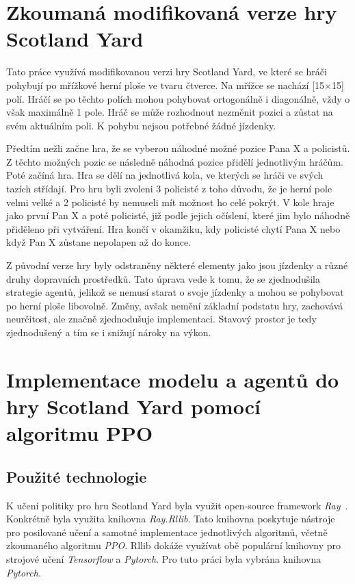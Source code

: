 \section{Zkoumaná modifikovaná verze hry Scotland Yard}\label{sec:zkoumana-modifikovana-verze-hry-scotland-yard}

Tato práce využívá modifikovanou verzi hry Scotland Yard, ve které se hráči pohybují po mřížkové herní ploše ve tvaru čtverce.
Na mřížce se nachází {\color{red}[15$\times$15]} polí.
Hráčí se po těchto polích mohou pohybovat ortogonálně i diagonálně, vždy o však maximálně 1 pole.
Hráč se může rozhodnout nezměnit pozici a zůstat na svém aktuálním poli.
K pohybu nejsou potřebné žádné jízdenky.

Předtím nežli začne hra, že se vyberou náhodné možné pozice Pana X a policistů.
Z těchto možných pozic se následně náhodná pozice přidělí jednotlivým hráčům.
Poté začíná hra.
Hra se dělí na jednotlivá kola, ve kterých se hráči ve svých tazích střídají.
Pro hru byli zvoleni 3 policisté z toho důvodu, že je herní pole velmi velké a 2 policisté by nemuseli mít možnost ho celé pokrýt.
V kole hraje jako první Pan X a poté policisté, již podle jejich očíslení, které jim bylo náhodně přiděleno při vytváření.
Hra končí v okamžiku, kdy policisté chytí Pana X nebo když Pan X zůstane nepolapen až do konce.

Z původní verze hry byly odstraněny některé elementy jako jsou jízdenky a různé druhy dopravních prostředků.
Tato úprava vede k tomu, že se zjednodušila strategie agentů, jelikož se nemusí starat o svoje jízdenky a mohou se pohybovat po herní ploše libovolně.
Změny, avšak nemění základní podstatu hry, zachovává neurčitost, ale značně zjednodušuje implementaci.
Stavový prostor je tedy zjednodušený a tím se i snižují nároky na výkon.

\section{Implementace modelu a agentů do hry Scotland Yard pomocí algoritmu PPO}
\label{sec:implementace}

\subsection{Použité technologie}\label{subsec:pouzite-technologie}
K učení politiky pro hru Scotland Yard byla využit open-source framework \emph{Ray}~\cite{Ray}.
Konkrétně byla využita knihovna \emph{Ray.Rllib}.
Tato knihovna poskytuje nástroje pro posilované učení a samotné implementace jednotlivých algoritmů, včetně zkoumaného algoritmu \emph{PPO}.
Rllib dokáže využívat obě populární knihovny pro strojové učení \emph{Tensorflow} a \emph{Pytorch}.
Pro tuto práci byla vybrána knihovna \emph{Pytorch}.

